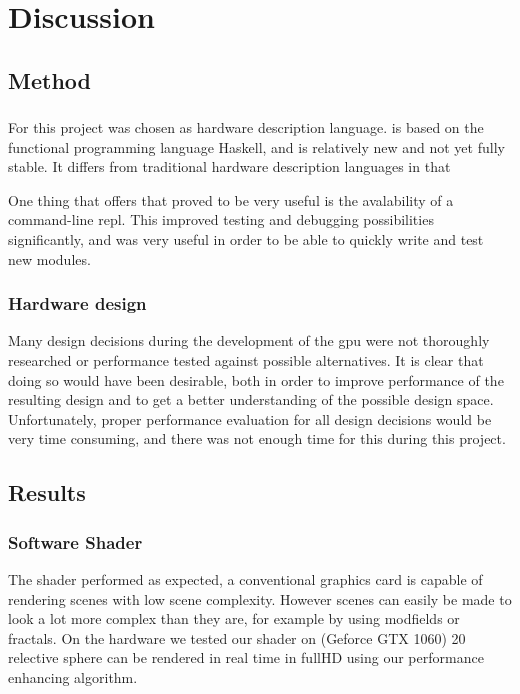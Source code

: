 \chapter{Discussion}
	
	\section{Method}
		
		\subsection{\clash}

			For this project \clash was chosen as hardware description language.
			\clash is based on the functional programming language Haskell, and
			is relatively new and not yet fully stable. It differs from 
			traditional hardware description languages in that 

			One thing that \clash offers that proved to be very useful is the 
			avalability of a command-line repl. This improved testing and 
			debugging possibilities significantly, and was very useful in order
			to be able to quickly write and test new modules.

		\subsection{Hardware design}

			Many design decisions during the development of the gpu were not
			thoroughly researched or performance tested against possible
			alternatives. It is clear that doing so would have been desirable,
			both in order to improve performance of the resulting design and to
			get a better understanding of the possible design space. 
			Unfortunately, proper performance evaluation for all design 
			decisions would be very time consuming, and there was not enough 
			time for this during this project.

	\section{Results}
		
		\subsection{Software Shader}

			The shader performed as expected, a conventional graphics card is 
			capable of rendering scenes with low scene complexity. However 
			scenes can easily be made to look a lot more complex than they are, 
			for example by using modfields or fractals. On the hardware we 
			tested our shader on (Geforce GTX 1060) 20 relective sphere can
			be rendered in real time in fullHD using our performance enhancing 
			algorithm.

